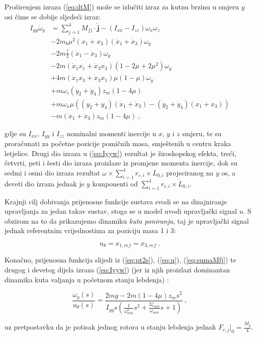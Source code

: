 \documentclass[11pt,a4paper]{article}
\begin{document}
Proširenjem izraza (\ref{eq:dtM}) može se izlučiti izraz za kutnu brzinu u smjeru $y$ osi  čime se dobije sljedeći izraz:
\begin{equation}
\begin{split}
I_{yy}\dot{\omega}_{y}  & = \sum_{j=1}^{4}M_{fj}\cdot  \bm{\hat{j}} - (I_{xx} - I_{zz})\omega_{x}\omega_{z} \\
&- 2m_{b}\mu^{2}(x_{1} + x_{3})(\dot{x}_{1} + \dot{x}_{3} )\omega_{y} \\
&- 2m\frac{l}{2}(\dot{x}_{1} - \dot{x}_{3})\omega_{y} \\
&- 2m(\dot{x}_{1}x_{1} + \dot{x}_{3}x_{3})(1-2\mu + 2\mu^{2})\omega_{y} \\
&+ 4m(\dot{x}_{1}x_{3} + \dot{x}_{3}x_{1})\mu(1-\mu)\omega_{y} \\
&+ m \omega_{z}(\dot{y}_{2} + \dot{y}_{4})z_{m}(1-4\mu) \\
&+ m\omega_{x}\mu ((y_{2} + y_{4})(\dot{x}_{1} + \dot{x}_{3})-(\dot{y}_{2} + \dot{y}_{4})(x_{1} + x_{3})) \\
&- m(\ddot{x}_{1} + \ddot{x}_{3})z_{m}(1 - 4\mu) \ ,
\end{split}
\label{eq:Iyyw}
\end{equation}

gdje su $I_{xx}$, $I_{yy}$ i $I_{zz}$ nominalni momenti inercije u $x$, $y$ i $z$ smjeru, te su proračunati za početne pozicije pomičnih masa, smještenih u centru kraka letjelice. Drugi dio izraza u (\ref{eq:Iyyw}) rezultat je žiroskopskog efekta, treći, četvrti, peti i šesti dio izraza proizlaze iz promjene momenta inercije, dok su sedmi i osmi dio izraza rezultat $\omega \times \sum_{i=1}^{4} r_{c,i}\times L_{0,i}$ projeciranog na $y$ os, a deveti dio izraza jednak je $y$ komponenti od $\sum_{i=1}^{4}r_{c,i}\times \dot{L}_{0,i}$.  

\medskip

Krajnji cilj dobivanja prijenosne funkcije sustava svodi se na dizajniranje upravljanja za jedan takav sustav, stoga se u model uvodi upravljački signal $u$. S obzirom na to da prikazujemo dinamiku \textit{kuta poniranja}, taj je upravljački signal jednak referentnim vrijednostima za poziciju masa 1 i 3:

\begin{equation}
 u_{\theta} = x_{1, ref} = x_{3, ref} \ .
 \label{eq:u}
 \end{equation} 

Konačno, prijenosna funkcija slijedi iz (\ref{eq:pt2s}), (\ref{eq:u}), (\ref{eq:sumaMfj}) te drugog i devetog dijela izraza (\ref{eq:Iyyw}) (jer iz njih proizlazi dominantan dinamika kuta valjanja u početnom stanju lebdenja) \cite{haus2} \cite{haus3}:

\begin{equation}
\boxed{
\frac{\omega_{y}(s)}{u_{\theta}(s)} = \frac{2mg - 2m(1-4\mu)z_{m}s^{2}}{I_{yy}s \left(\frac{1}{\omega_{mm}^{2}}s^{2} + \frac{2\zeta_{mm}}{\omega_{mm}}s + 1  \right)}
} \ ,
\label{eq:tf}
\end{equation}

uz pretpostavku da je potisak jednog rotora u stanju lebdenja jednak $F_{r,j}|_{0} = \frac{M_{g}}{4}$.
\end{document}
